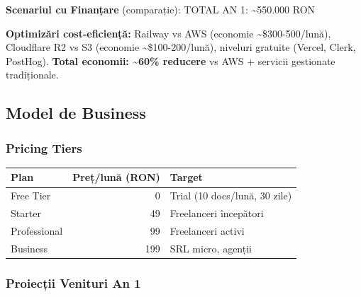 \documentclass[11pt,a4paper]{article}
\begin{document}
\textbf{Scenariul cu Finanțare} (comparație): TOTAL AN 1: \textasciitilde550.000 RON

\textbf{Optimizări cost-eficiență:} Railway vs AWS (economie \textasciitilde\$300-500/lună), Cloudflare R2 vs S3 (economie \textasciitilde\$100-200/lună), niveluri gratuite (Vercel, Clerk, PostHog). \textbf{Total economii: \textasciitilde60\% reducere} vs AWS + servicii gestionate tradiționale.

\subsection{Model de Business}

\subsubsection{Pricing Tiers}

\begin{table}[H]
\centering
\begin{tabular}{|l|r|l|}
\hline
\rowcolor{lightgray}
\textbf{Plan} & \textbf{Preț/lună (RON)} & \textbf{Target} \\
\hline
Free Tier & 0 & Trial (10 docs/lună, 30 zile) \\
Starter & 49 & Freelanceri începători \\
Professional & 99 & Freelanceri activi \\
Business & 199 & SRL micro, agenții \\
\hline
\end{tabular}
\end{table}

\subsubsection{Proiecții Venituri An 1}
\end{document}
